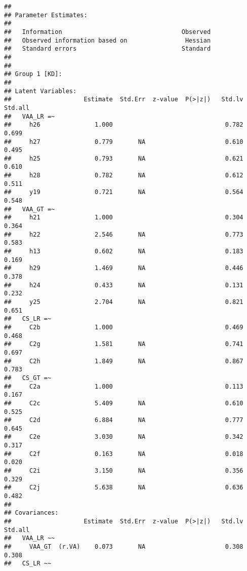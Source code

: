 \documentclass[
]{article}
\begin{document}
\begin{verbatim}
## 
## Parameter Estimates:
## 
##   Information                                 Observed
##   Observed information based on                Hessian
##   Standard errors                             Standard
## 
## 
## Group 1 [KD]:
## 
## Latent Variables:
##                    Estimate  Std.Err  z-value  P(>|z|)   Std.lv  Std.all
##   VAA_LR =~                                                             
##     h26               1.000                               0.782    0.699
##     h27               0.779       NA                      0.610    0.495
##     h25               0.793       NA                      0.621    0.610
##     h28               0.782       NA                      0.612    0.511
##     y19               0.721       NA                      0.564    0.548
##   VAA_GT =~                                                             
##     h21               1.000                               0.304    0.364
##     h22               2.546       NA                      0.773    0.583
##     h13               0.602       NA                      0.183    0.169
##     h29               1.469       NA                      0.446    0.378
##     h24               0.433       NA                      0.131    0.232
##     y25               2.704       NA                      0.821    0.651
##   CS_LR =~                                                              
##     C2b               1.000                               0.469    0.468
##     C2g               1.581       NA                      0.741    0.697
##     C2h               1.849       NA                      0.867    0.783
##   CS_GT =~                                                              
##     C2a               1.000                               0.113    0.167
##     C2c               5.409       NA                      0.610    0.525
##     C2d               6.884       NA                      0.777    0.645
##     C2e               3.030       NA                      0.342    0.317
##     C2f               0.163       NA                      0.018    0.020
##     C2i               3.150       NA                      0.356    0.329
##     C2j               5.638       NA                      0.636    0.482
## 
## Covariances:
##                    Estimate  Std.Err  z-value  P(>|z|)   Std.lv  Std.all
##   VAA_LR ~~                                                             
##     VAA_GT  (r.VA)    0.073       NA                      0.308    0.308
##   CS_LR ~~                                                              

\end{verbatim}
\end{document}
